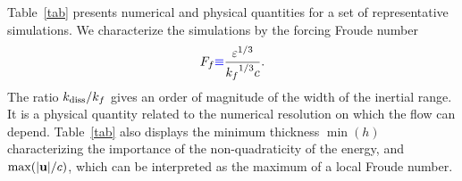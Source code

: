 Table~\ref{tab} presents numerical and physical quantities for a set
of representative simulations.
%
We characterize the simulations by the forcing Froude number
\begin{equation}
F_f {\color{blue}\equiv} \frac{\varepsilon^{1/3}}{{k_f}^{1/3}c}.
\end{equation}
%
The ratio $k_{\mbox{\scriptsize diss}}/k_f$ gives an order of magnitude of the width of the
inertial range.  It is a physical quantity related to the numerical
resolution on which the flow can depend.
%
Table~\ref{tab} also displays the minimum thickness $\min(h)$
characterizing the importance of the non-quadraticity of the energy,
and $\max(|\textbf{u}|/c)$, which can be interpreted as the maximum of a
local Froude number.




